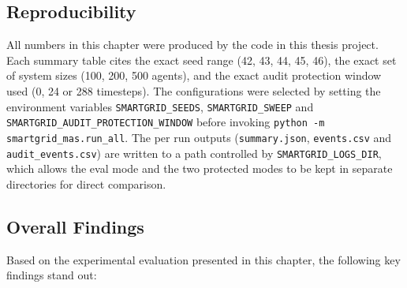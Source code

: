 \par \vspace{0.35cm}

\subsection{Reproducibility}

All numbers in this chapter were produced by the code in this thesis project. Each summary table cites the exact seed range (42, 43, 44, 45, 46), the exact set of system sizes (100, 200, 500 agents), and the exact audit protection window used (0, 24 or 288 timesteps). The configurations were selected by setting the environment variables \texttt{SMARTGRID\_SEEDS}, \texttt{SMARTGRID\_SWEEP} and \texttt{SMARTGRID\_AUDIT\_PROTECTION\_WINDOW} before invoking \texttt{python -m smartgrid\_mas.run\_all}. The per run outputs (\texttt{summary.json}, \texttt{events.csv} and \texttt{audit\_events.csv}) are written to a path controlled by \texttt{SMARTGRID\_LOGS\_DIR}, which allows the eval mode and the two protected modes to be kept in separate directories for direct comparison.

\par \vspace{0.35cm}

\subsection{Overall Findings}

Based on the experimental evaluation presented in this chapter, the following key findings stand out:

